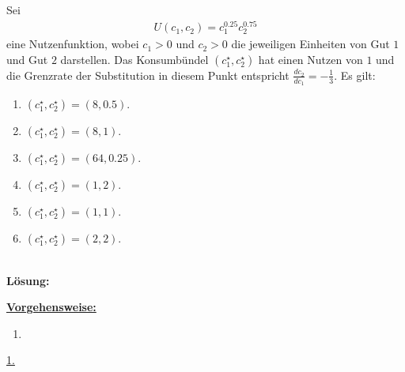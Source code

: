 \subsection*{}
Sei 
\begin{align*}
	U(c_1,c_2) = c_1^{0.25} c_2^{0.75}
\end{align*}
eine Nutzenfunktion, wobei $c_1 > 0$ und $c_2 > 0$ die jeweiligen Einheiten von Gut $1$ und Gut $2$ darstellen.
Das Konsumbündel $(c_1^\star, c_2^\star)$ hat einen Nutzen von $1$ und die Grenzrate der Substitution in diesem Punkt entspricht
$\frac{d c_2}{d c_1} = - \frac{1}{3}$.
Es gilt:
\renewcommand{\labelenumi}{(\alph{enumi})}
\begin{enumerate}
	\item 
	$ (c_1^\star,c_2^\star) = (8,0.5) $.
	\item
	$ (c_1^\star,c_2^\star) = (8,1) $.
	\item
	$ (c_1^\star,c_2^\star) = (64,0.25) $.
	\item
	$ (c_1^\star,c_2^\star) = (1,2) $.
	\item
	$ (c_1^\star,c_2^\star) = (1,1) $.
	\item
	$ (c_1^\star,c_2^\star) = (2,2) $.
\end{enumerate}
\ \\
\textbf{Lösung:}
\begin{mdframed}
\underline{\textbf{Vorgehensweise:}}
\renewcommand{\labelenumi}{\theenumi.}
\begin{enumerate}
\item 
\end{enumerate}
\end{mdframed}

\underline{1. }\\





\newpage

